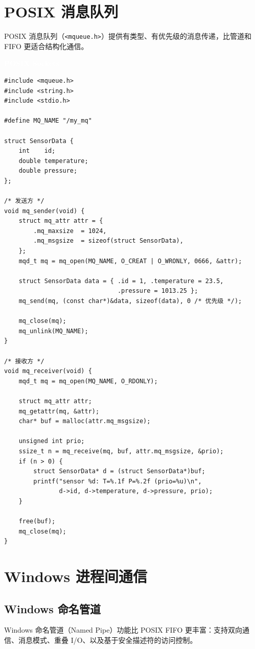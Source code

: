 \documentclass[12pt,a4paper,fontset=fandol]{ctexbook}
\newcommand{\Tp}[1]{\texttt{#1}}
\newcommand{\posixlabel}{%
  \noindent\begin{tcolorbox}[sharp corners,colback=posixheadbg,colframe=posixheadbg,
    left=6pt,right=6pt,top=2pt,bottom=2pt,boxrule=0pt]
  \textcolor{white}{\small\bfseries\sffamily POSIX Sockets}\end{tcolorbox}%
}
\begin{document}
\section{POSIX 消息队列}

POSIX 消息队列（\Tp{<mqueue.h>}）提供有类型、有优先级的消息传递，比管道和 FIFO 更适合结构化通信。

\posixlabel
\begin{lstlisting}[style=cstyle]
#include <mqueue.h>
#include <string.h>
#include <stdio.h>

#define MQ_NAME "/my_mq"

struct SensorData {
    int    id;
    double temperature;
    double pressure;
};

/* 发送方 */
void mq_sender(void) {
    struct mq_attr attr = {
        .mq_maxsize  = 1024,
        .mq_msgsize  = sizeof(struct SensorData),
    };
    mqd_t mq = mq_open(MQ_NAME, O_CREAT | O_WRONLY, 0666, &attr);

    struct SensorData data = { .id = 1, .temperature = 23.5,
                               .pressure = 1013.25 };
    mq_send(mq, (const char*)&data, sizeof(data), 0 /* 优先级 */);

    mq_close(mq);
    mq_unlink(MQ_NAME);
}

/* 接收方 */
void mq_receiver(void) {
    mqd_t mq = mq_open(MQ_NAME, O_RDONLY);

    struct mq_attr attr;
    mq_getattr(mq, &attr);
    char* buf = malloc(attr.mq_msgsize);

    unsigned int prio;
    ssize_t n = mq_receive(mq, buf, attr.mq_msgsize, &prio);
    if (n > 0) {
        struct SensorData* d = (struct SensorData*)buf;
        printf("sensor %d: T=%.1f P=%.2f (prio=%u)\n",
               d->id, d->temperature, d->pressure, prio);
    }

    free(buf);
    mq_close(mq);
}
\end{lstlisting}

\section{Windows 进程间通信}

\subsection{Windows 命名管道}

Windows 命名管道（Named Pipe）功能比 POSIX FIFO 更丰富：支持双向通信、消息模式、重叠 I/O、以及基于安全描述符的访问控制。
\end{document}
